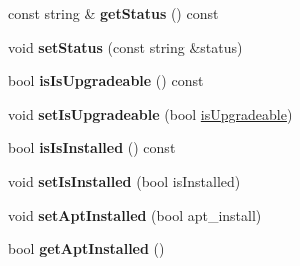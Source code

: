 \begin{DoxyCompactItemize}
const string \& {\bfseries get\+Status} () const
\item 
\mbox{\label{classDevice_a46b5e30da5b43b09c0785a054bfb678a}} 
void {\bfseries set\+Status} (const string \&status)
\item 
\mbox{\label{classDevice_afe6f638cc2bcc512f5bc1f2fef39fe88}} 
bool {\bfseries is\+Is\+Upgradeable} () const
\item 
\mbox{\label{classDevice_a3b5d4af66cacd8e1b0e45219c16ee084}} 
void {\bfseries set\+Is\+Upgradeable} (bool \hyperlink{classDevice_a1078839b751f8366b5170d4daefa26b4}{is\+Upgradeable})
\item 
\mbox{\label{classDevice_a697feb57b759c13cb1b56f004e61229b}} 
bool {\bfseries is\+Is\+Installed} () const
\item 
\mbox{\label{classDevice_aec222a879b4a9aadd1a083a7aff2e516}} 
void {\bfseries set\+Is\+Installed} (bool is\+Installed)
\item 
\mbox{\label{classDevice_a15d7c755aed944da8514902d06d21ea9}} 
void {\bfseries set\+Apt\+Installed} (bool apt\+\_\+install)
\item 
\mbox{\label{classDevice_a2ea735319a841af580e6ada8ab3b4076}} 
bool {\bfseries get\+Apt\+Installed} ()
\end{DoxyCompactItemize}
